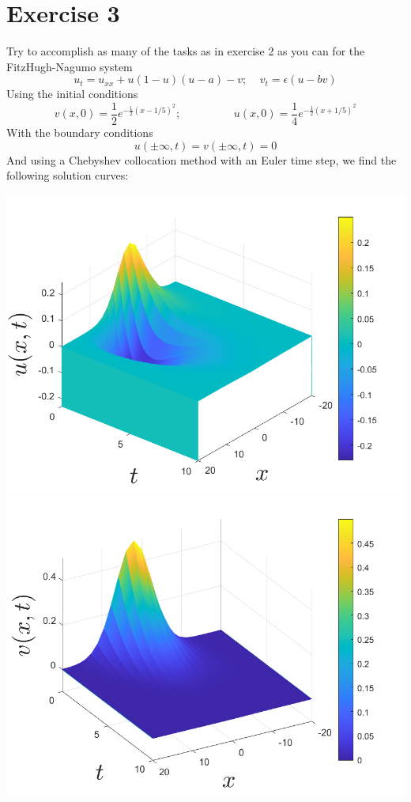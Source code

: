 \documentclass{article}
\begin{document}
\section*{Exercise 3}
Try to accomplish as many of the tasks as in exercise 2 as you can for the FitzHugh-Nagumo system
\[u_t = u_{xx} + u(1 - u)(u - a) - v; \:\:\:\:\: v_t = \epsilon(u - bv)\]
Using the initial conditions 
\[v(x,0) = \frac{1}{2}e^{-\frac{1}{2}(x - 1/5)^2}; \hspace{2cm} u(x,0) = \frac{1}{4}e^{-\frac{1}{2}(x + 1/5)^2}\]
With the boundary conditions
\[u(\pm \infty, t) = v(\pm \infty, t) = 0\]
And using a Chebyshev collocation method with an Euler time step, we find the following solution curves:
\begin{center}
    \includegraphics[scale = 0.35]{scicompProb3u}
    \includegraphics[scale = 0.35]{scicompProb3v}

\end{center}
\end{document}
